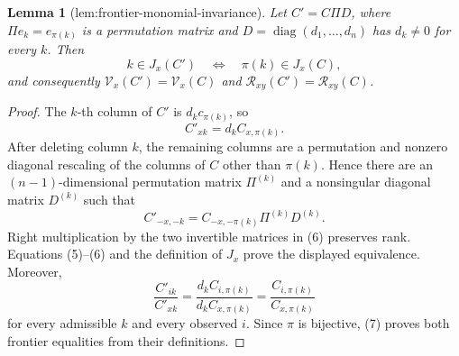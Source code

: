 \documentclass{article}
\newtheorem{lemma}{Lemma}
\begin{document}
\begin{lemma}[lem:frontier-monomial-invariance]\label{lem:frontier-monomial-invariance}
Let \(C'=C\Pi D\), where \(\Pi e_k=e_{\pi(k)}\) is a permutation matrix and \(D=\operatorname{diag}(d_1,\ldots,d_n)\) has \(d_k\ne0\) for every \(k\). Then
\[
 k\in J_x(C')\quad\Longleftrightarrow\quad \pi(k)\in J_x(C),
\]
and consequently \(\mathcal V_x(C')=\mathcal V_x(C)\) and \(\mathcal R_{xy}(C')=\mathcal R_{xy}(C)\).
\end{lemma}
\begin{proof}
The \(k\)-th column of \(C'\) is \(d_kc_{\pi(k)}\), so
\[
 C'_{xk}=d_kC_{x,\pi(k)}. \tag{5}
\]
After deleting column \(k\), the remaining columns are a permutation and nonzero diagonal rescaling of the columns of \(C\) other than \(\pi(k)\). Hence there are an \((n-1)\)-dimensional permutation matrix \(\Pi^{(k)}\) and a nonsingular diagonal matrix \(D^{(k)}\) such that
\[
 C'_{-x,-k}=C_{-x,-\pi(k)}\Pi^{(k)}D^{(k)}. \tag{6}
\]
Right multiplication by the two invertible matrices in (6) preserves rank. Equations (5)--(6) and the definition of \(J_x\) prove the displayed equivalence. Moreover,
\[
 \frac{C'_{ik}}{C'_{xk}}
 =\frac{d_kC_{i,\pi(k)}}{d_kC_{x,\pi(k)}}
 =\frac{C_{i,\pi(k)}}{C_{x,\pi(k)}} \tag{7}
\]
for every admissible \(k\) and every observed \(i\). Since \(\pi\) is bijective, (7) proves both frontier equalities from their definitions.
\end{proof}
\end{document}
